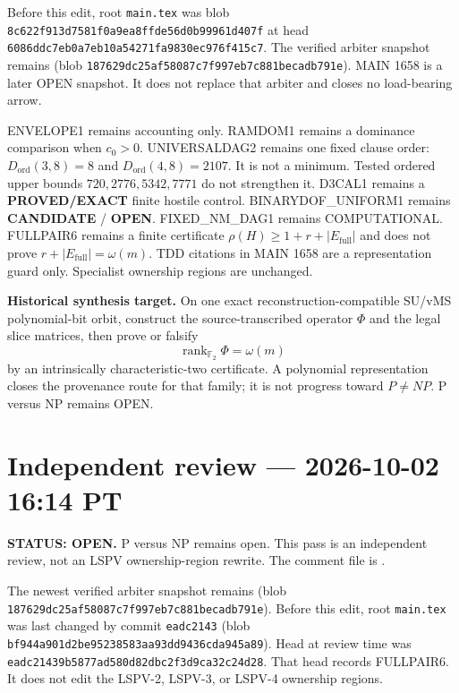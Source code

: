 \documentclass[11pt]{article}
\begin{document}
Before this edit, root \texttt{main.tex} was blob \texttt{8c622f913d7581f0a9ea8ffde56d0b99961d407f}
at head \texttt{6086ddc7eb0a7eb10a54271fa9830ec976f415c7}.
The verified arbiter snapshot remains
(blob \texttt{187629dc25af58087c7f997eb7c881becadb791e}).
MAIN 1658 is a later OPEN snapshot. It does not replace that arbiter and closes no load-bearing arrow.

ENVELOPE1 remains accounting only. RAMDOM1 remains a dominance comparison when \(c_0>0\).
UNIVERSALDAG2 remains one fixed clause order: \(D_{\mathrm{ord}}(3,8)=8\) and
\(D_{\mathrm{ord}}(4,8)=2107\). It is not a minimum. Tested ordered upper bounds
\(720,2776,5342,7771\) do not strengthen it.
D3CAL1 remains a \textbf{PROVED/EXACT} finite hostile control.
BINARYDOF\_UNIFORM1 remains \textbf{CANDIDATE} / \textbf{OPEN}.
FIXED\_NM\_DAG1 remains COMPUTATIONAL.
FULLPAIR6 remains a finite certificate \(\rho(H)\ge 1+r+|E_{\mathrm{full}}|\)
and does not prove \(r+|E_{\mathrm{full}}|=\omega(m)\).
TDD citations in MAIN 1658 are a representation guard only.
Specialist ownership regions are unchanged.

\begin{candidatebox}
\textbf{Historical synthesis target.}
On one exact reconstruction-compatible SU/vMS polynomial-bit orbit, construct the
source-transcribed operator \(\Phi\) and the legal slice matrices, then prove or falsify
\[
\operatorname{rank}_{\mathbb F_2}\Phi=\omega(m)
\]
by an intrinsically characteristic-two certificate. A polynomial representation closes the
provenance route for that family; it is not progress toward \(P\neq NP\). P versus NP remains OPEN.
\end{candidatebox}

\section{Independent review --- 2026-10-02 16:14 PT}
\textbf{STATUS: OPEN.} P versus NP remains open. This pass is an independent review, not an
LSPV ownership-region rewrite. The comment file is
.

The newest verified arbiter snapshot remains
(blob \texttt{187629dc25af58087c7f997eb7c881becadb791e}).
Before this edit, root \texttt{main.tex} was last changed by commit \texttt{eadc2143}
(blob \texttt{bf944a901d2be95238583aa93dd9436cda945a89}). Head at review time was
\texttt{eadc21439b5877ad580d82dbc2f3d9ca32c24d28}. That head records FULLPAIR6. It does not
edit the LSPV-2, LSPV-3, or LSPV-4 ownership regions.
\end{document}
